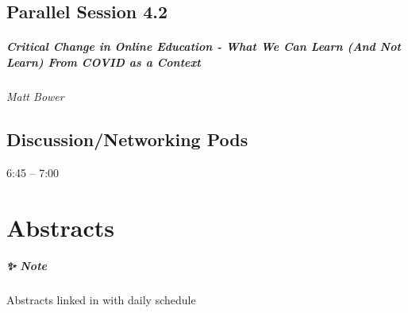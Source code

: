 \documentclass[
]{book}
\begin{document}
\hypertarget{parallel-session-4.2}{%
\section*{Parallel Session 4.2}\label{parallel-session-4.2}}

\begin{reflect}
\hypertarget{critical-change-in-online-education---what-we-can-learn-and-not-learn-from-covid-as-a-context}{%
\paragraph*{Critical Change in Online Education - What We Can Learn (And
Not Learn) From COVID as a
Context}\label{critical-change-in-online-education---what-we-can-learn-and-not-learn-from-covid-as-a-context}}

\emph{Matt Bower}
\end{reflect}

\hypertarget{discussionnetworking-pods}{%
\section*{Discussion/Networking Pods}\label{discussionnetworking-pods}}

6:45 -- 7:00

\hypertarget{abstracts}{%
\chapter{Abstracts}\label{abstracts}}

\begin{protip}
\hypertarget{note}{%
\paragraph*{✨ Note}\label{note}}

Abstracts linked in with daily schedule
\end{protip}
\end{document}
